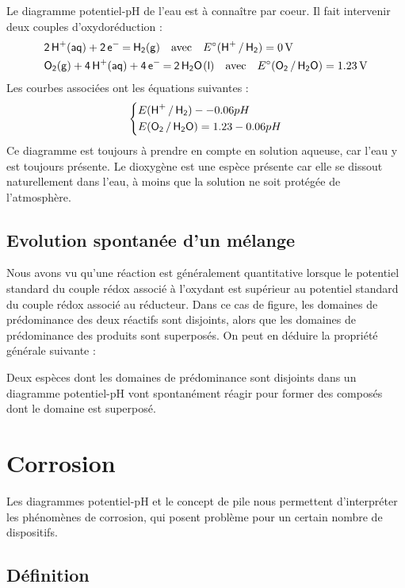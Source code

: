 \documentclass[11pt,fleqn]{book} %
\begin{document}
Le diagramme potentiel-pH de l'eau est à connaître par coeur. Il fait intervenir deux couples d'oxydoréduction :
\begin{align}
	&\ce{2 H^+(aq) + 2 e^- = H2(g)} \quad \mathrm{avec} \quad E^\circ(\ce{H^+ / H2}) = 0\,{\rm V} \\
	&\ce{O2(g) +4 H^+(aq) + 4 e^- = 2 H2O(l)} \quad \mathrm{avec} \quad E^\circ(\ce{O2 / H2O}) = 1.23\,{\rm V} 
\end{align}
Les courbes associées ont les équations suivantes :
\begin{equation}
	\begin{dcases}
		E(\ce{H^+ / H2}) - -0.06 pH \\
		E(\ce{O2 / H2O}) = 1.23 - 0.06pH
	\end{dcases}
\end{equation}
Ce diagramme est toujours à prendre en compte en solution aqueuse, car l'eau y est toujours présente. Le dioxygène est une espèce présente car elle se dissout naturellement dans l'eau, à moins que la solution ne soit protégée de l'atmosphère.

\subsection{Evolution spontanée d'un mélange}

Nous avons vu qu'une réaction est généralement quantitative lorsque le potentiel standard du couple rédox associé à l'oxydant est supérieur au potentiel standard du couple rédox associé au réducteur. Dans ce cas de figure, les domaines de prédominance des deux réactifs sont disjoints, alors que les domaines de prédominance des produits sont superposés. On peut en déduire la propriété générale suivante :
\begin{proposition}
	Deux espèces dont les domaines de prédominance sont disjoints dans un diagramme potentiel-pH vont spontanément réagir pour former des composés dont le domaine est superposé.
\end{proposition}

\section{Corrosion}

Les diagrammes potentiel-pH et le concept de pile nous permettent d'interpréter les phénomènes de corrosion, qui posent problème pour un certain nombre de dispositifs. 

\subsection{Définition}
\end{document}
